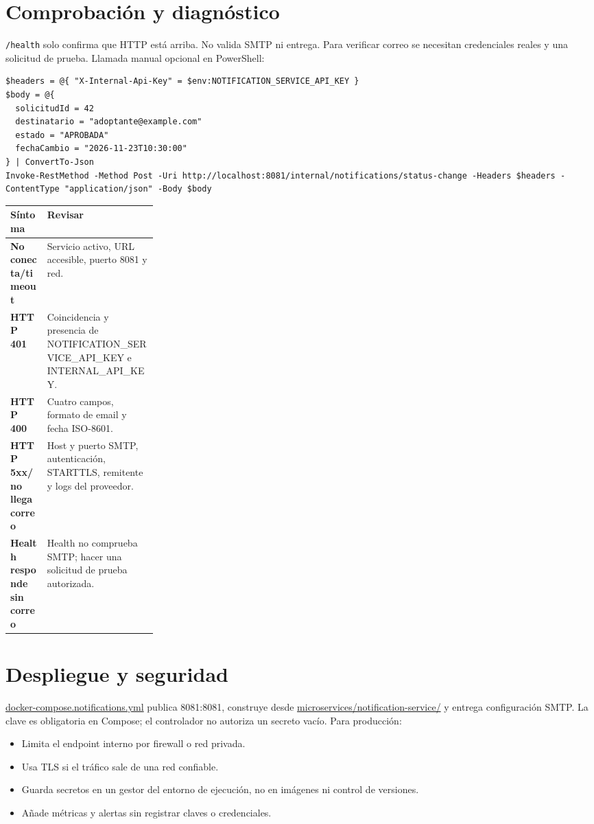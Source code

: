 \documentclass[11pt,a4paper]{article}
\newcommand{\pathcode}[1]{\small\url{#1}}\newcommand{\envvar}[1]{\small\url{#1}}
\begin{document}
\section{Comprobación y diagnóstico}
\texttt{/health} solo confirma que HTTP está arriba. No valida SMTP ni entrega. Para verificar correo se necesitan credenciales reales y una solicitud de prueba.
Llamada manual opcional en PowerShell:
\begin{lstlisting}
$headers = @{ "X-Internal-Api-Key" = $env:NOTIFICATION_SERVICE_API_KEY }
$body = @{
  solicitudId = 42
  destinatario = "adoptante@example.com"
  estado = "APROBADA"
  fechaCambio = "2026-11-23T10:30:00"
} | ConvertTo-Json
Invoke-RestMethod -Method Post -Uri http://localhost:8081/internal/notifications/status-change -Headers $headers -ContentType "application/json" -Body $body
\end{lstlisting}
\begin{tabularx}{\linewidth}{>{\bfseries}p{0.25\linewidth}X}\toprule Síntoma & Revisar\\\midrule
No conecta/timeout & Servicio activo, URL accesible, puerto 8081 y red.\\
HTTP 401 & Coincidencia y presencia de NOTIFICATION\_SERVICE\_API\_KEY e INTERNAL\_API\_KEY.\\
HTTP 400 & Cuatro campos, formato de email y fecha ISO-8601.\\
HTTP 5xx/no llega correo & Host y puerto SMTP, autenticación, STARTTLS, remitente y logs del proveedor.\\
Health responde sin correo & Health no comprueba SMTP; hacer una solicitud de prueba autorizada.\\\bottomrule\end{tabularx}

\section{Despliegue y seguridad}
\pathcode{docker-compose.notifications.yml} publica 8081:8081, construye desde \pathcode{microservices/notification-service/} y entrega configuración SMTP. La clave es obligatoria en Compose; el controlador no autoriza un secreto vacío. Para producción:
\begin{itemize}
\item Limita el endpoint interno por firewall o red privada.
\item Usa TLS si el tráfico sale de una red confiable.
\item Guarda secretos en un gestor del entorno de ejecución, no en imágenes ni control de versiones.
\item Añade métricas y alertas sin registrar claves o credenciales.
\end{itemize}
\end{document}
